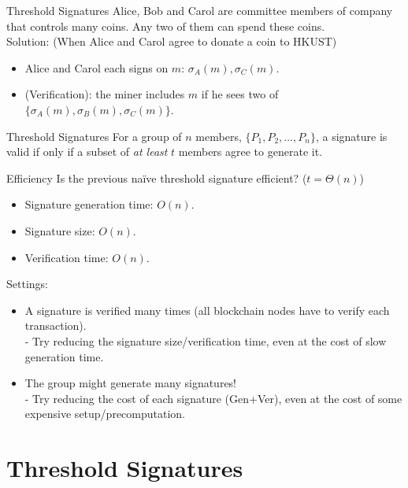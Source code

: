 \documentclass[10pt]{beamer}
\begin{document}
\begin{frame}{Threshold Signatures}
Alice, Bob and Carol are committee members of company that controls many coins. {\color{red} Any two of them} can spend these coins. \\ \pause 
Solution: (When Alice and Carol agree to donate a coin to HKUST) 
\begin{itemize}
    \item Alice and Carol each signs on $m$: $\sigma_A(m), \sigma_C(m)$. 
    \item (Verification): the miner includes $m$ if he sees two of $\{\sigma_A(m),\sigma_B(m), \sigma_C(m)\}$. 
\end{itemize}
\begin{block}{Threshold Signatures} 
    For a group of $n$ members, $\{P_1, P_2,\dots, P_n\}$, a signature is valid if only if a subset of \textit{at least} $t$ members agree to generate it.  
\end{block}
\end{frame}


\begin{frame}{Efficiency}
Is the previous na\"ive threshold signature efficient? ($t=\Theta(n)$)\\
\begin{itemize}
    \item Signature generation time: $O(n)$. 
    \item Signature size: $O(n)$. 
    \item Verification time: $O(n)$. 
\end{itemize}
\pause 

Settings: 
\begin{itemize}
\item  A signature is verified many times (all blockchain nodes have to verify each transaction). \\
- Try reducing the signature size/verification time, even at the cost of slow generation time. \pause 
\item The group might generate many signatures! \\
- Try reducing the cost of each signature (Gen+Ver), even at the cost of some expensive setup/precomputation. 
\end{itemize}
\end{frame}

\section{Threshold Signatures}
\end{document}
